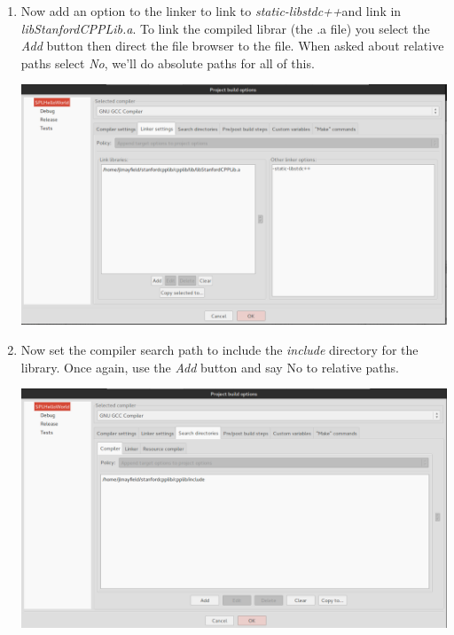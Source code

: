 \documentclass[10pt]{article}
\begin{document}
\begin{enumerate}
\item Now add an option to the linker to link to \textit{static-libstdc++}and link in \textit{libStanfordCPPLib.a}.  To link the compiled librar (the .a file) you select the \textit{Add} button then direct the file browser to the file.  When asked about relative paths select \textit{No}, we'll do absolute paths for all of this.  

\vspace{.1in}
\begin{center}
\includegraphics[scale=.35]{scpplib-linker.png}
\end{center}
\vspace{.1in}

\item Now set the compiler search path to include the \textit{include} directory for the library. Once again, use the \textit{Add} button and say No to relative paths.

\vspace{.1in}
\begin{center}
\includegraphics[scale=.35]{scpplib-compilersearch.png}
\end{center}
\vspace{.1in}


\end{enumerate}
\end{document}

